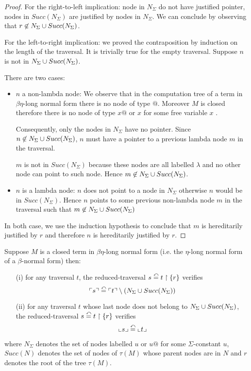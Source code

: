 \begin{proof}
For the right-to-left implication: node in $N_\Sigma$ do not have justified pointer, nodes
in $Succ(N_\Sigma)$ are justified by nodes in $N_\Sigma$. We can conclude by observing that $r \not\in N_\Sigma \cup Succ(N_\Sigma)$.

For the left-to-right implication: we proved the contraposition by induction on the length of the traversal.
It is trivially true for the empty traversal.
Suppose $n$ is not in $N_\Sigma \cup Succ(N_\Sigma)$.

There are two cases:
\begin{itemize}
\item $n$ a non-lambda node:
We observe that in the computation tree of a term in $\beta \eta$-long normal form
there is no node of type $@$. Moreover $M$ is closed therefore there is no node of type $x@$ or $x$ for some
free variable  $x$ .

Consequently, only the nodes in $N_\Sigma$ have no pointer.
Since $n \not\in N_\Sigma \cup Succ(N_\Sigma)$, $n$ must have a pointer to a previous lambda node $m$ in the traversal.

$m$ is not in $Succ(N_\Sigma)$ because these nodes are all labelled $\lambda$ and no other node can point to such node.
Hence $m\not\in N_\Sigma \cup Succ(N_\Sigma)$.

\item $n$ is a lambda node:
$n$ does not point to a node in $N_\Sigma$ otherwise $n$ would be in $Succ(N_\Sigma)$. Hence $n$ points to some
previous non-lambda node $m$ in the traversal such that $m\not\in N_\Sigma \cup Succ(N_\Sigma)$
\end{itemize}
In both case, we use the induction hypothesis to conclude that $m$ is hereditarily justified by $r$ and
therefore $n$ is hereditarily justified by $r$.
\end{proof}

\begin{lem}
\label{lem:redtrav_trav}
Suppose $M$ is a closed term in $\beta \eta$-long normal form (i.e. the $\eta$-long normal form of a $\beta$-normal form) then:
\begin{itemize}
\item[(i)] for any traversal $t$, the reduced-traversal $s \stackrel{\curvearrowleft}{=} t \upharpoonright \{ r \}$ verifies
$$ \ulcorner s \urcorner \stackrel{\curvearrowleft}{=} \ulcorner t \urcorner \setminus \left( N_\Sigma \cup Succ(N_\Sigma) \right)$$
\item[(ii)] for any traversal $t$ whose last node does not belong to $N_\Sigma \cup Succ(N_\Sigma)$,
     the reduced-traversal $s \stackrel{\curvearrowleft}{=} t \upharpoonright \{ r \}$ verifies
    $$ \llcorner s \lrcorner \stackrel{\curvearrowleft}{=} \llcorner t \lrcorner$$
\end{itemize}

where $N_\Sigma$ denotes the set of nodes labelled $u$ or $u@$ for
some $\Sigma$-constant $u$, $Succ(N)$ denotes the set of nodes of
$\tau(M)$ whose parent nodes are in $N$ and $r$ denotes the root of
the tree $\tau(M)$.
\end{lem}

